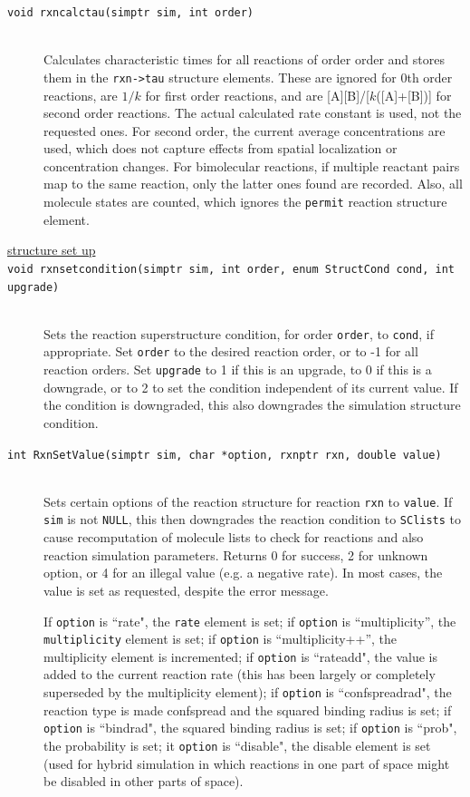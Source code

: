 \documentclass {scrbook}
\newcommand {\ttt} {\texttt}
\begin{document}
\begin{description}
\item[\ttt{void rxncalctau(simptr sim, int order)}]
\hfill \\
Calculates characteristic times for all reactions of order order and stores them in the \ttt{rxn->tau} structure elements. These are ignored for 0th order reactions, are $1/k$ for first order reactions, and are [A][B]/[$k$([A]+[B])] for second order reactions. The actual calculated rate constant is used, not the requested ones. For second order, the current average concentrations are used, which does not capture effects from spatial localization or concentration changes. For bimolecular reactions, if multiple reactant pairs map to the same reaction, only the latter ones found are recorded. Also, all molecule states are counted, which ignores the \ttt{permit} reaction structure element.

\item[\underline{structure set up}]

\item[\ttt{void rxnsetcondition(simptr sim, int order, enum StructCond cond, int upgrade)}]
\hfill \\
Sets the reaction superstructure condition, for order \ttt{order}, to \ttt{cond}, if appropriate. Set \ttt{order} to the desired reaction order, or to -1 for all reaction orders. Set \ttt{upgrade} to 1 if this is an upgrade, to 0 if this is a downgrade, or to 2 to set the condition independent of its current value. If the condition is downgraded, this also downgrades the simulation structure condition.

\item[\ttt{int RxnSetValue(simptr sim, char *option, rxnptr rxn, double value)}]
\hfill \\
Sets certain options of the reaction structure for reaction \ttt{rxn} to \ttt{value}. If \ttt{sim} is not \ttt{NULL}, this then downgrades the reaction condition to \ttt{SClists} to cause recomputation of molecule lists to check for reactions and also reaction simulation parameters. Returns 0 for success, 2 for unknown option, or 4 for an illegal value (e.g. a negative rate). In most cases, the value is set as requested, despite the error message.

If \ttt{option} is ``rate", the \ttt{rate} element is set; if \ttt{option} is ``multiplicity'', the \ttt{multiplicity} element is set; if \ttt{option} is ``multiplicity++'', the multiplicity element is incremented; if \ttt{option} is ``rateadd", the value is added to the current reaction rate (this has been largely or completely superseded by the multiplicity element); if \ttt{option} is ``confspreadrad", the reaction type is made confspread and the squared binding radius is set; if \ttt{option} is ``bindrad", the squared binding radius is set; if \ttt{option} is ``prob", the probability is set; it \ttt{option} is ``disable", the disable element is set (used for hybrid simulation in which reactions in one part of space might be disabled in other parts of space).


\end{description}
\end{document}
